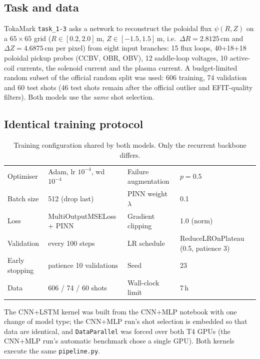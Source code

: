 \documentclass[11pt,a4paper]{article}
\begin{document}
\subsection{Task and data}
TokaMark \texttt{task\_1-3} asks a network to reconstruct the poloidal flux $\psi(R,Z)$ on a $65\times65$ grid
($R\in[0.2,2.0]$\,m, $Z\in[-1.5,1.5]$\,m, i.e.\ $\Delta R=2.8125$\,cm and $\Delta Z=4.6875$\,cm per pixel) from eight input branches: 15 flux
loops, 40+18+18 poloidal pickup probes (CCBV, OBR, OBV), 12 saddle-loop voltages, 10 active-coil currents, the solenoid
current and the plasma current. A budget-limited random subset of the official random split was used: 606 training, 74
validation and 60 test shots (46 test shots remain after the official outlier and EFIT-quality filters). Both models use the
\emph{same} shot selection.

\subsection{Identical training protocol}
\begin{table}[H]
\centering
\caption{Training configuration shared by both models. Only the recurrent backbone differs.}
\small
\begin{tabular}{@{}p{2.2cm}p{4.4cm}p{3.5cm}p{4.6cm}@{}}
\toprule
Optimiser & Adam, lr $10^{-4}$, wd $10^{-4}$ & Failure augmentation & $p=0.5$ \\
Batch size & 512 (drop last) & PINN weight $\lambda$ & 0.1 \\
Loss & MultiOutputMSELoss + PINN & Gradient clipping & 1.0 (norm) \\
Validation & every 100 steps & LR schedule & ReduceLROnPlateau (0.5, patience 3) \\
Early stopping & patience 10 validations & Seed & 23 \\
Data & 606 / 74 / 60 shots & Wall-clock limit & 7\,h \\
\bottomrule
\end{tabular}
\end{table}

The CNN+LSTM kernel was built from the CNN+MLP notebook with one change of model type; the CNN+MLP run's shot selection is
embedded so that data are identical, and \texttt{DataParallel} was forced over both T4 GPUs (the CNN+MLP run's automatic
benchmark chose a single GPU). Both kernels execute the same \texttt{pipeline.py}.

\end{document}
